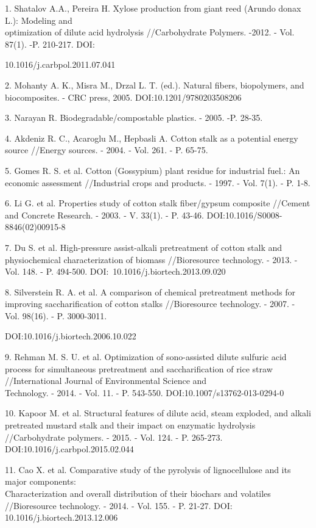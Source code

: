 \begin{noparindent}
1.
  Shatalov A.A., Pereira H. Xylose production from giant reed (Arundo
  donax L.): Modeling and \\optimization of dilute acid hydrolysis
  //Carbohydrate Polymers. -2012. - Vol. 87(1). -P. 210-217. DOI:

  10.1016/j.carbpol.2011.07.041

2.
  Mohanty A. K., Misra M., Drzal L. T. (ed.). Natural fibers,
  biopolymers, and biocomposites. - CRC press, 2005.
  DOI:10.1201/9780203508206

3.
  Narayan R. Biodegradable/compostable plastics. - 2005. -P. 28-35.

4.
  Akdeniz R. C., Acaroglu M., Hepbasli A. Cotton stalk as a potential
  energy source //Energy sources. - 2004. - Vol. 261. - P. 65-75.

5.
  Gomes R. S. et al. Cotton (Gossypium) plant residue for industrial
  fuel.: An economic assessment //Industrial crops and products. -
  1997. - Vol. 7(1). - P. 1-8.

6.
  Li G. et al. Properties study of cotton stalk fiber/gypsum composite
  //Cement and Concrete Research. - 2003. - V. 33(1). - P. 43-46.
  DOI:10.1016/S0008-8846(02)00915-8

7.
  Du S. et al. High-pressure assist-alkali pretreatment of cotton stalk
  and physiochemical characterization of biomass //Bioresource
  technology. - 2013. - Vol. 148. - P. 494-500.
  DOI:~10.1016/j.biortech.2013.09.020

8.
  Silverstein R. A. et al. A comparison of chemical pretreatment methods
  for improving saccharification of cotton stalks //Bioresource
  technology. - 2007. - Vol. 98(16). - P. 3000-3011.

  DOI:10.1016/j.biortech.2006.10.022

9.
  Rehman M. S. U. et al. Optimization of sono-assisted dilute sulfuric
  acid process for simultaneous pretreatment and saccharification of
  rice straw //International Journal of Environmental Science and
  \\Technology. - 2014. - Vol. 11. - P. 543-550.
  DOI:10.1007/s13762-013-0294-0

10.
  Kapoor M. et al. Structural features of dilute acid, steam exploded,
  and alkali pretreated mustard stalk and their impact on enzymatic
  hydrolysis //Carbohydrate polymers. - 2015. - Vol. 124. - P.
  265-273. DOI:10.1016/j.carbpol.2015.02.044

11.
  Cao X. et al. Comparative study of the pyrolysis of lignocellulose and
  its major components: \\Characterization and overall distribution of
  their biochars and volatiles //Bioresource technology. - 2014. -
  Vol. 155. - P. 21-27. DOI: 10.1016/j.biortech.2013.12.006


\end{noparindent}
